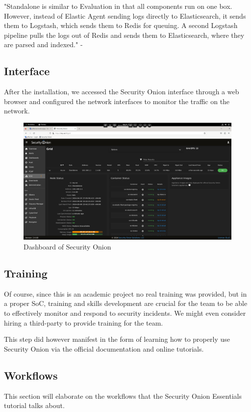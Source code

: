 "Standalone is similar to Evaluation in that all components run on one box.
However, instead of Elastic Agent sending logs directly to Elasticsearch, it sends them to Logstash, which sends them to Redis for queuing.
A second Logstash pipeline pulls the logs out of Redis and sends them to Elasticsearch, where they are parsed and indexed." - \cite{security-onion-docs}

\subsection{Interface}
After the installation, we accessed the Security Onion interface through a web browser and configured the network interfaces to monitor the traffic on the network.

\begin{figure}[H]
    \centering
    \includegraphics[width=1\textwidth]{src/assets/images/security-onion-dashboard.png}
    \caption{Dashboard of Security Onion}
\end{figure}

\subsection{Training}
Of course, since this is an academic project no real training was provided, but in a proper SoC, training and skills development are crucial for the team to be able to effectively monitor and respond to security incidents.
We might even consider hiring a third-party to provide training for the team.

This step did however manifest in the form of learning how to properly use Security Onion via the official documentation and online tutorials.

\subsection{Workflows}
This section will elaborate on the workflows that the Security Onion Essentials tutorial talks about.

